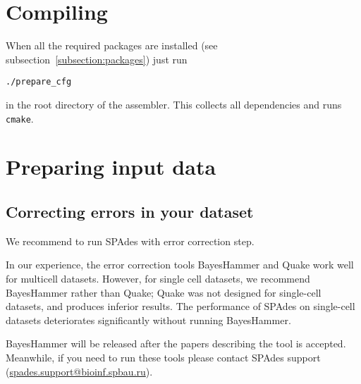 \documentclass{article}
\def\spades{SPAdes}
\begin{document}
\section{Compiling}
When all the required packages are installed (see 
subsection~\ref{subsection:packages})
just run
\begin{lstlisting}
./prepare_cfg
\end{lstlisting}
in the root directory of the assembler. 
This collects all dependencies and runs {\tt cmake}.

\section{Preparing input data}
\subsection{Correcting errors in your dataset}\label{subsec:bh}
We recommend to run {\spades} with error correction step.

In our experience, the error correction tools BayesHammer and Quake work well for multicell datasets. 
However, for single cell datasets, we recommend BayesHammer rather than Quake; 
Quake was not designed for single-cell datasets, and produces inferior results. 
The performance of {\spades} on single-cell datasets deteriorates 
significantly without running BayesHammer. 

BayesHammer will be released after the papers describing the tool is accepted. 
Meanwhile, if you need to run these tools please contact SPAdes support (\url{spades.support@bioinf.spbau.ru}).
\end{document}
